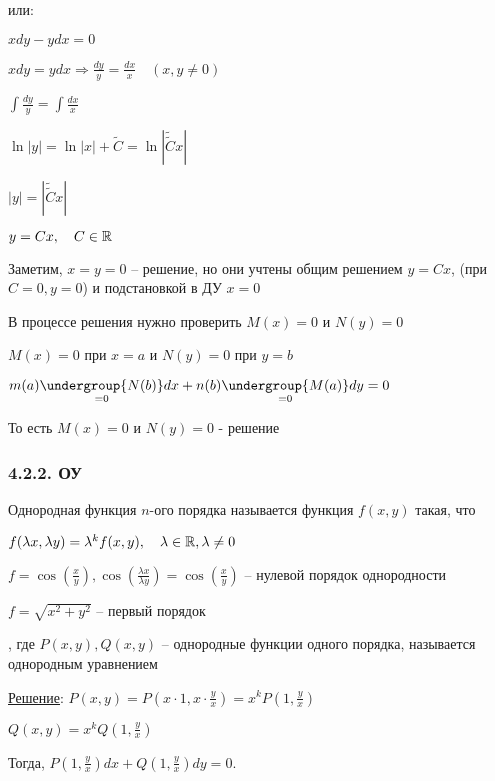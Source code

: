 \documentclass[12pt]{article}
\begin{document}
    или: 

    \Ex $xdy - ydx = 0$

    $xdy = ydx \Longrightarrow \frac{dy}{y} = \frac{dx}{x} \quad (x, y \neq 0)$

    $\int \frac{dy}{y} = \int \frac{dx}{x}$

    $\ln|y| = \ln|x| + \tilde{C} = \ln|\tilde{\tilde{C}}x|$

    $|y| = |\tilde{\tilde{C}}x|$

    $y = Cx, \quad C \in \mathbb{R}$

    Заметим, $x = y = 0$ -- решение, но они учтены общим решением $y = Cx$, (при $C = 0, y = 0$) и подстановкой в ДУ $x = 0$

    \Nota В процессе решения нужно проверить $M(x) = 0$ и $N(y) = 0$

    $M(x) = 0$ при $x = a$ и $N(y) = 0$ при $y = b$

    $m(a)\underset{=0}{\undergroup{N(b)}}dx + n(b)\underset{=0}{\undergroup{M(a)}}dy = 0$

    То есть $M(x) = 0$ и $N(y) = 0$ - решение

    \hypertarget{homogeneousequation}{}

    \subsubsection{4.2.2. ОУ}

     Однородная функция $n$-ого порядка называется функция $f(x, y)$ такая, что

    $f(\lambda x, \lambda y) = \lambda^k f(x, y), \quad \lambda \in \mathbb{R}, \lambda \neq 0$

    \Exs $f = \cos\left(\frac{x}{y}\right), \cos\left(\frac{\lambda x}{\lambda y}\right) = \cos\left(\frac{x}{y}\right)$ -- нулевой порядок однородности

    $f = \sqrt{x^2 + y^2}$ -- первый порядок

     , где $P(x, y), Q(x, y)$ -- однородные функции одного порядка, называется однородным уравнением

    \underline{Решение}: $P(x, y) = P\left(x \cdot 1, x \cdot \frac{y}{x}\right) = x^k P\left(1, \frac{y}{x}\right)$

    $Q(x, y) = x^k Q\left(1, \frac{y}{x}\right)$

    Тогда, $P\left(1, \frac{y}{x}\right)dx + Q\left(1, \frac{y}{x}\right)dy = 0$.
\end{document}
